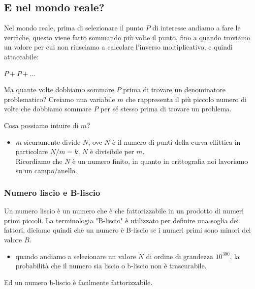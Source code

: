 \documentclass[11pt, oneside]{article}   	%
\begin{document}
\subsection*{E nel mondo reale?}
Nel mondo reale, prima di selezionare il punto $P$ di interesse andiamo a fare le verifiche, questo viene fatto sommando più volte il punto, fino a quando troviamo un valore per cui non riusciamo a calcolare l'inverso moltiplicativo, e quindi attaccabile:
\begin{center}
$P + P + ... $ 
\end{center}
Ma quante volte dobbiamo sommare $P$ prima di trovare un denominatore problematico?
Creiamo una variabile $m$ che rappresenta il più piccolo numero di volte che dobbiamo sommare $P$ per sé stesso prima di trovare un problema.

Cosa possiamo intuire di $m$?
\begin{itemize}
\item $m$ sicuramente divide $N$, ove $N$ è il numero di punti della curva ellittica in particolare $N/m = k$, $N$ è divisibile per $m$.\\ Ricordiamo che $N$ è un numero finito, in quanto in crittografia noi lavoriamo su un campo/anello.
\end{itemize}
\subsubsection*{Numero liscio e B-liscio}
Un numero liscio è un numero che è che fattorizzabile in un prodotto di numeri primi piccoli. La terminologia "B-liscio" è utilizzato per definire una soglia dei fattori, diciamo quindi che un numero è B-liscio se i numeri primi sono minori del valore $B$. 
\begin{itemize}
\item quando andiamo a selezionare un valore $N$ di ordine di grandezza $10^{300}$, la probabilità che il numero sia liscio o b-liscio non è trascurabile.
\end{itemize}
Ed un numero b-liscio è facilmente fattorizzabile.
\end{document}
